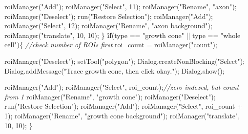 \documentclass[
  12pt,
  a4paper,
]{book}
\newenvironment{Shaded}{}{}
\newcommand{\CommentTok}[1]{\textcolor[rgb]{0.38,0.63,0.69}{\textit{#1}}}
\newcommand{\ControlFlowTok}[1]{\textcolor[rgb]{0.00,0.44,0.13}{\textbf{#1}}}
\newcommand{\DecValTok}[1]{\textcolor[rgb]{0.25,0.63,0.44}{#1}}
\newcommand{\NormalTok}[1]{#1}
\newcommand{\OperatorTok}[1]{\textcolor[rgb]{0.40,0.40,0.40}{#1}}
\newcommand{\StringTok}[1]{\textcolor[rgb]{0.25,0.44,0.63}{#1}}
\begin{document}
\begin{Shaded}
\begin{Highlighting}[]
\NormalTok{    roiManager}\OperatorTok{(}\StringTok{"Add"}\OperatorTok{);}
\NormalTok{    roiManager}\OperatorTok{(}\StringTok{"Select"}\OperatorTok{,} \DecValTok{11}\OperatorTok{);}
\NormalTok{    roiManager}\OperatorTok{(}\StringTok{"Rename"}\OperatorTok{,} \StringTok{"axon"}\OperatorTok{);}
\NormalTok{    roiManager}\OperatorTok{(}\StringTok{"Deselect"}\OperatorTok{);}
\NormalTok{    run}\OperatorTok{(}\StringTok{"Restore Selection"}\OperatorTok{);}
\NormalTok{    roiManager}\OperatorTok{(}\StringTok{"Add"}\OperatorTok{);}
\NormalTok{    roiManager}\OperatorTok{(}\StringTok{"Select"}\OperatorTok{,} \DecValTok{12}\OperatorTok{);}
\NormalTok{    roiManager}\OperatorTok{(}\StringTok{"Rename"}\OperatorTok{,} \StringTok{"axon background"}\OperatorTok{);}
\NormalTok{    roiManager}\OperatorTok{(}\StringTok{"translate"}\OperatorTok{,} \DecValTok{10}\OperatorTok{,} \DecValTok{10}\OperatorTok{);}
\OperatorTok{\}}
\ControlFlowTok{if}\OperatorTok{(}\NormalTok{type }\OperatorTok{==} \StringTok{"growth cone"} \OperatorTok{||}\NormalTok{ type }\OperatorTok{==} \StringTok{"whole cell"}\OperatorTok{)\{}
    \CommentTok{//check number of ROIs first}
\NormalTok{    roi\_count }\OperatorTok{=}\NormalTok{ roiManager}\OperatorTok{(}\StringTok{"count"}\OperatorTok{);}

\NormalTok{    roiManager}\OperatorTok{(}\StringTok{"Deselect"}\OperatorTok{);}
\NormalTok{    setTool}\OperatorTok{(}\StringTok{"polygon"}\OperatorTok{);}
\NormalTok{    Dialog}\OperatorTok{.}\NormalTok{createNonBlocking}\OperatorTok{(}\StringTok{"Select"}\OperatorTok{);}
\NormalTok{    Dialog}\OperatorTok{.}\NormalTok{addMessage}\OperatorTok{(}\StringTok{"Trace growth cone, then click \textquotesingle{}okay\textquotesingle{}."}\OperatorTok{);}
\NormalTok{    Dialog}\OperatorTok{.}\NormalTok{show}\OperatorTok{();}
    
\NormalTok{    roiManager}\OperatorTok{(}\StringTok{"Add"}\OperatorTok{);}
\NormalTok{    roiManager}\OperatorTok{(}\StringTok{"Select"}\OperatorTok{,}\NormalTok{ roi\_count}\OperatorTok{);}\CommentTok{//zero indexed, but count from 1}
\NormalTok{    roiManager}\OperatorTok{(}\StringTok{"Rename"}\OperatorTok{,} \StringTok{"growth cone"}\OperatorTok{);}
\NormalTok{    roiManager}\OperatorTok{(}\StringTok{"Deselect"}\OperatorTok{);}
\NormalTok{    run}\OperatorTok{(}\StringTok{"Restore Selection"}\OperatorTok{);}
\NormalTok{    roiManager}\OperatorTok{(}\StringTok{"Add"}\OperatorTok{);}
\NormalTok{    roiManager}\OperatorTok{(}\StringTok{"Select"}\OperatorTok{,}\NormalTok{ roi\_count }\OperatorTok{+} \DecValTok{1}\OperatorTok{);}
\NormalTok{    roiManager}\OperatorTok{(}\StringTok{"Rename"}\OperatorTok{,} \StringTok{"growth cone background"}\OperatorTok{);}
\NormalTok{    roiManager}\OperatorTok{(}\StringTok{"translate"}\OperatorTok{,} \DecValTok{10}\OperatorTok{,} \DecValTok{10}\OperatorTok{);}
\OperatorTok{\}}


\end{Highlighting}
\end{Shaded}
\end{document}
